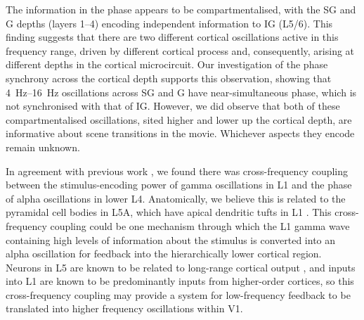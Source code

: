The information in the phase appears to be compartmentalised, with the \ac{SG} and \ac{G} depths (layers 1--4) encoding independent information to \ac{IG} (\acl{L5/6}).
This finding suggests that there are two different cortical oscillations active in this frequency range, driven by different cortical process and, consequently, arising at different depths in the cortical microcircuit.
Our investigation of the phase synchrony across the cortical depth supports this observation, showing that \SIrange{4}{16}{Hz} oscillations across \ac{SG} and \ac{G} have near-simultaneous phase, which is not synchronised with that of \ac{IG}.
However, we did observe that both of these compartmentalised oscillations, sited higher and lower up the cortical depth, are informative about scene transitions in the movie.
Whichever aspects they encode remain unknown.

In agreement with previous work \citep{Spaak2012}, we found there was cross-frequency coupling between the stimulus-encoding power of gamma oscillations in \acs{L1} and the phase of alpha oscillations in lower \acs{L4}.
Anatomically, we believe this is related to the pyramidal cell bodies in \acs{L5A}, which have apical dendritic tufts in \acs{L1} \citep{Hill2013,Zhu2004}.
This cross-frequency coupling could be one mechanism through which the \acs{L1} gamma wave containing high levels of information about the stimulus is converted into an alpha oscillation for feedback into the hierarchically lower cortical region.
Neurons in \acs{L5} are known to be related to long-range cortical output \citep{Hill2013}, and inputs into \acs{L1} are known to be predominantly inputs from higher-order cortices, so this cross-frequency coupling may provide a system for low-frequency feedback to be translated into higher frequency oscillations within \ac{V1}.
